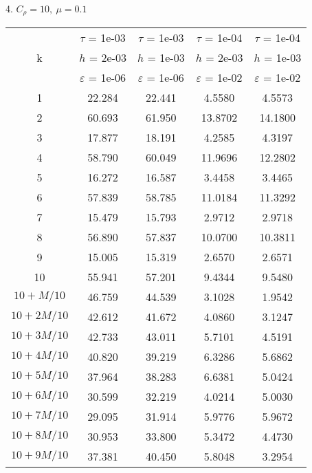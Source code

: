 4. $C_{\rho} = 10, \ \mu = 0.1$
\begin{center}
	\begin{tabular}{ |c|c|c|c|c| } 
		\hline
		& $\tau$ = 1e-03 & $\tau$ = 1e-03 & $\tau$ = 1e-04 & $\tau$ = 1e-04 \\ 
		k & $h$ = 2e-03 & $h$ = 1e-03 & $h$ = 2e-03 & $h$ = 1e-03 \\ 
		& $\varepsilon$ = 1e-06 & $\varepsilon$ = 1e-06 & $\varepsilon$ = 1e-02 & $\varepsilon$ = 1e-02 \\ 
		\hline
		1 & 22.284 & 22.441 & 4.5580 & 4.5573 \\
		\hline
		2 & 60.693 & 61.950 & 13.8702 & 14.1800 \\
		\hline
		3 & 17.877 & 18.191 & 4.2585 & 4.3197 \\
		\hline
		4 & 58.790 & 60.049 & 11.9696 & 12.2802 \\
		\hline
		5 & 16.272 & 16.587 & 3.4458 & 3.4465 \\
		\hline
		6 & 57.839 & 58.785 & 11.0184 & 11.3292 \\
		\hline
		7 & 15.479 & 15.793 & 2.9712 & 2.9718 \\
		\hline
		8 & 56.890 & 57.837 & 10.0700 & 10.3811 \\
		\hline
		9 & 15.005 & 15.319 & 2.6570 & 2.6571 \\
		\hline
		10 & 55.941 & 57.201 & 9.4344 & 9.5480 \\
		\hline
		$10 + M/10$ & 46.759 & 44.539 & 3.1028 & 1.9542 \\
		\hline
		$10 + 2M/10$ & 42.612 & 41.672 & 4.0860 & 3.1247 \\
		\hline
		$10 + 3M/10$ & 42.733 & 43.011 & 5.7101 & 4.5191 \\
		\hline
		$10 + 4M/10$ & 40.820 & 39.219 & 6.3286 & 5.6862 \\
		\hline
		$10 + 5M/10$ & 37.964 & 38.283 & 6.6381 & 5.0424 \\
		\hline
		$10 + 6M/10$ & 30.599 & 32.219 & 4.0214 & 5.0030 \\
		\hline
		$10 + 7M/10$ & 29.095 & 31.914 & 5.9776 & 5.9672 \\
		\hline
		$10 + 8M/10$ & 30.953 & 33.800 & 5.3472 & 4.4730 \\
		\hline
		$10 + 9M/10$ & 37.381 & 40.450 & 5.8048 & 3.2954 \\
		\hline
	\end{tabular}
\end{center}

